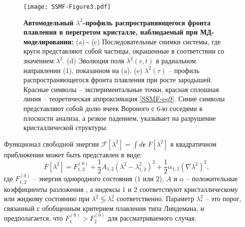 \begin{figure*}[!t]
\centering
 \texttt{[image: SSMF-Figure3.pdf]}
 \caption{\textbf{Автомодельный $ \lambda^2$-профиль распространяющегося фронта плавления в перегретом кристалле, наблюдаемый при МД-моделировании:}
 (a) - (c) Последовательные снимки системы, где круги представляют собой частицы, окрашенные в соответствии со значением $\lambda^2$.
 (d) Эволюция поля $\lambda^2(r, t)$ в радиальном направлении (1), показанном на (a).
 (e) $\lambda^2(\tau)$ -- профиль распространяющегося фронта плавления при росте зародышей.
 Красные символы -- экспериментальные точки, красная сплошная линия -- теоретическая аппроксимация \eqref{SSMF-eq9}.
 Синие символы представляют собой долю ячеек Вороного с 6-ю соседями в плоскости анализа, а резкое падением, указывает на разрушение кристаллической структуры.}
\label{SSMF-Figure3}
\end{figure*}

Функционал свободной энергии $\mathcal{F}[\lambda^2] = \int{d\mathbf{r}\;F[\lambda^2]}$ в квадратичном приближении может быть представлен в виде:
\begin{equation}
\label{SSMF-eq5}
F[\lambda^2] = F_{\mathrm{1,2}}^{(0)}+\frac{1}{2}A_{1,2}\left(\lambda^2-\lambda_{1,2}^2\right)^2 + \frac{1}{2}\alpha_{1,2}\left(\nabla\lambda^2\right)^2,
\end{equation}
где $F_{1,2}^{(0)}$ -- энергия однородного состояния ($1$ или $2$), $A$ и $\alpha$ -- положительные коэффициенты разложения \cite{book.desai}, а индексы $ 1 $ и $ 2 $ соответствуют кристаллическому или жидкому состоянию при $\lambda^2 \lessgtr \lambda_\ast^2$ соответственно.
Параметр $\lambda_\ast^2 $ -- это порог, связанный с обобщенным критерием плавления типа Линдемана, и предполагается, что $ F_{\mathrm{1}} ^ {(0)}> F_{\mathrm{2}} ^ {(0)} $ для рассматриваемого случая.

